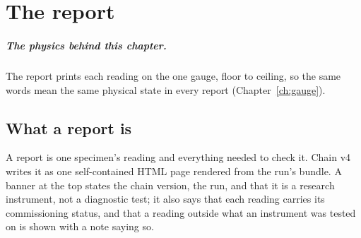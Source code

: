 \chapter{The report}\label{ch:report}

\paragraph{The physics behind this chapter.} The report prints each reading on the one gauge, floor to ceiling, so the same words mean the same physical state in every report (Chapter~\ref{ch:gauge}).

\section{What a report is}

A report is one specimen's reading and everything needed to check it. Chain v4 writes it as one self-contained HTML page rendered from the run's
bundle. A banner at the top states the chain version, the run, and that it is a research instrument, not a diagnostic test; it also says that each
reading carries its commissioning status, and that a reading outside what an instrument was tested on is shown with a note saying so.

